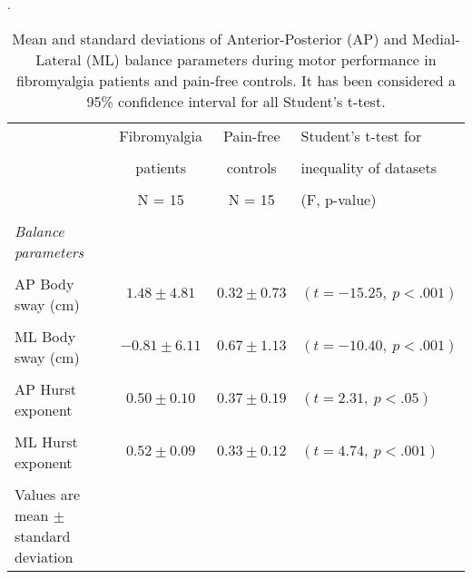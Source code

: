 \begin{table}[ht].\caption{Mean and standard deviations of Anterior-Posterior (AP) and Medial-Lateral (ML) balance parameters during motor performance in fibromyalgia patients and pain-free controls. It has been considered a 95\% confidence interval for all Student’s t-test.}
\begin{tabular}{lccl}
	\hline 
	& Fibromyalgia & Pain-free  & Student's t-test for\\ \\
	 & patients & controls &  inequality of datasets\\ \\
 	 & N = 15 & N = 15 & (F, p-value) \\ \\ \hline
\emph{Balance parameters}  &  &  &  \\ \\
\hspace{0.3cm} AP Body sway (cm)  & $1.48 \pm 4.81$ & $0.32 \pm 0.73$ & $(t=-15.25,~p < .001)$ \\ \\  
\hspace{0.3cm} ML Body sway (cm)  & $-0.81 \pm 6.11$ & $0.67 \pm 1.13$ & $(t=-10.40,~p < .001)$ \\ \\ 
\hspace{0.3cm} AP Hurst exponent & $0.50 \pm 0.10$ & $0.37 \pm 0.19$ & $(t= 2.31,~p < .05)$ \\ \\
\hspace{0.3cm} ML Hurst exponent & $0.52 \pm 0.09$ & $0.33 \pm 0.12$ & $(t= 4.74,~p < .001)$ \\ \\ \hline
Values are mean $\pm$ standard deviation\\
\end{tabular}
\label{tab:balance}
\end{table}
